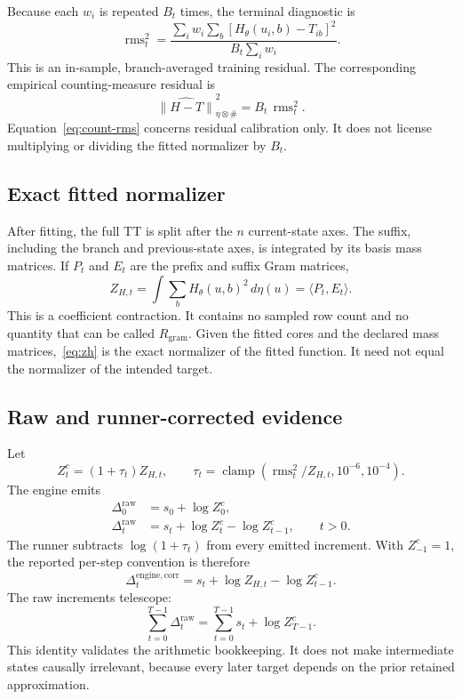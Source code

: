 \documentclass[11pt]{article}
\DeclareMathOperator{\rms}{rms}
\DeclareMathOperator{\clamp}{clamp}
\begin{document}
Because each $w_i$ is repeated $B_t$ times, the terminal diagnostic is
\begin{equation}\label{eq:rms}
\rms_t^2
=\frac{\sum_iw_i\sum_b[H_\theta(u_i,b)-T_{ib}]^2}
 {B_t\sum_iw_i}.
\end{equation}
This is an in-sample, branch-averaged training residual. The corresponding
empirical counting-measure residual is
\begin{equation}\label{eq:count-rms}
\widehat{\|H-T\|}_{\eta\otimes\#}^2=B_t\,\rms_t^2.
\end{equation}
Equation~\eqref{eq:count-rms} concerns residual calibration only. It does not
license multiplying or dividing the fitted normalizer by $B_t$.

\subsection{Exact fitted normalizer}

After fitting, the full TT is split after the $n$ current-state axes. The
suffix, including the branch and previous-state axes, is integrated by its
basis mass matrices. If $P_t$ and $E_t$ are the prefix and suffix Gram
matrices,
\begin{equation}\label{eq:zh}
Z_{H,t}
=\int\sum_b H_\theta(u,b)^2\,d\eta(u)
=\langle P_t,E_t\rangle.
\end{equation}
This is a coefficient contraction. It contains no sampled row count and no
quantity that can be called $R_{\mathrm{gram}}$. Given the fitted cores and
the declared mass matrices,~\eqref{eq:zh} is the exact normalizer of the
fitted function. It need not equal the normalizer of the intended target.

\subsection{Raw and runner-corrected evidence}

Let
\[
Z^c_t=(1+\tau_t)Z_{H,t},
\qquad
\tau_t=\clamp(\rms_t^2/Z_{H,t},10^{-6},10^{-4}).
\]
The engine emits
\begin{align}
\Delta^{\mathrm{raw}}_0&=s_0+\log Z^c_0,\\
\Delta^{\mathrm{raw}}_t&=s_t+\log Z^c_t-\log Z^c_{t-1},
\qquad t>0.
\end{align}
The runner subtracts $\log(1+\tau_t)$ from every emitted increment. With
$Z^c_{-1}=1$, the reported per-step convention is therefore
\begin{equation}\label{eq:corr-increment}
\Delta^{\mathrm{engine,corr}}_t
=s_t+\log Z_{H,t}-\log Z^c_{t-1}.
\end{equation}
The raw increments telescope:
\begin{equation}\label{eq:telescope}
\sum_{t=0}^{T-1}\Delta^{\mathrm{raw}}_t
=\sum_{t=0}^{T-1}s_t+\log Z^c_{T-1}.
\end{equation}
This identity validates the arithmetic bookkeeping. It does not make
intermediate states causally irrelevant, because every later target depends
on the prior retained approximation.
\end{document}
